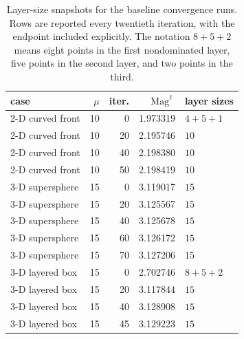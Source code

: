 \documentclass{article}
\newcommand{\Mag}{\operatorname{Mag}}
\begin{document}
\begin{table}[htbp]
\centering
\small
\setlength{\tabcolsep}{4pt}
\begin{tabular}{lrrrl}
\hline
case & $\mu$ & iter. & $\Mag^\ell$ & layer sizes \\
\hline
2-D curved front & 10 & 0 & 1.973319 & $4+5+1$ \\
2-D curved front & 10 & 20 & 2.195746 & $10$ \\
2-D curved front & 10 & 40 & 2.198380 & $10$ \\
2-D curved front & 10 & 50 & 2.198419 & $10$ \\
3-D supersphere & 15 & 0 & 3.119017 & $15$ \\
3-D supersphere & 15 & 20 & 3.125567 & $15$ \\
3-D supersphere & 15 & 40 & 3.125678 & $15$ \\
3-D supersphere & 15 & 60 & 3.126172 & $15$ \\
3-D supersphere & 15 & 70 & 3.127206 & $15$ \\
3-D layered box & 15 & 0 & 2.702746 & $8+5+2$ \\
3-D layered box & 15 & 20 & 3.117844 & $15$ \\
3-D layered box & 15 & 40 & 3.128908 & $15$ \\
3-D layered box & 15 & 45 & 3.129223 & $15$ \\
\hline
\end{tabular}
\caption{Layer-size snapshots for the baseline convergence runs.  Rows are reported every twentieth iteration, with the endpoint included explicitly.  The notation $8+5+2$ means eight points in the first nondominated layer, five points in the second layer, and two points in the third.}
\label{tab:convergence-layer-snapshots}
\end{table}
\end{document}
